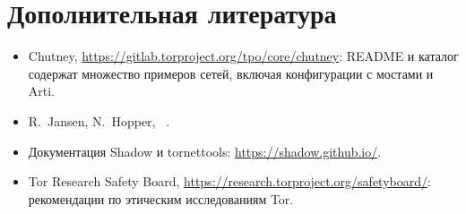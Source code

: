 \section*{Дополнительная литература}
\begin{itemize}
  \item Chutney, \url{https://gitlab.torproject.org/tpo/core/chutney}: README и каталог  содержат множество примеров сетей, включая конфигурации с мостами и Arti.
  \item R.~Jansen, N.~Hopper, ~\cite{jansen2012shadow}.
  \item Документация Shadow и tornettools: \url{https://shadow.github.io/}.
  \item Tor Research Safety Board, \url{https://research.torproject.org/safetyboard/}: рекомендации по этическим исследованиям Tor.
\end{itemize}
